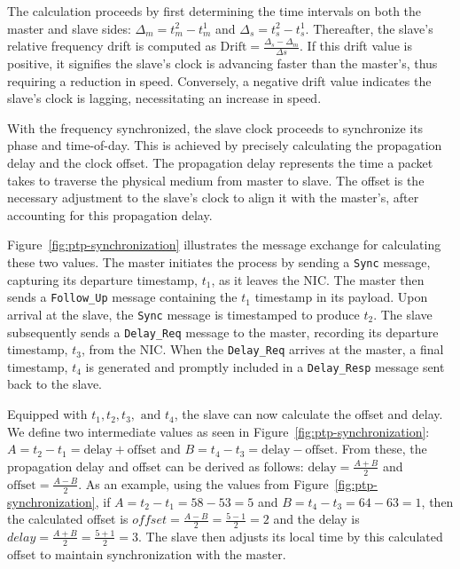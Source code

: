 The calculation proceeds by first determining the time intervals on both the master and slave sides: $\Delta_{m}=t_{m}^{2}-t_{m}^{1}$ and $\Delta_{s}=t_{s}^{2}-t_{s}^{1}$. Thereafter, the slave's relative frequency drift is computed as $\text{Drift}=\frac{\Delta_{s}-\Delta_{m}}{\Delta{s}}$. If this drift value is positive, it signifies the slave's clock is advancing faster than the master's, thus requiring a reduction in speed. Conversely, a negative drift value indicates the slave's clock is lagging, necessitating an increase in speed.

With the frequency synchronized, the slave clock proceeds to synchronize its phase and time-of-day. This is achieved by precisely calculating the propagation delay and the clock offset. The propagation delay represents the time a packet takes to traverse the physical medium from master to slave. The offset is the necessary adjustment to the slave's clock to align it with the master's, after accounting for this propagation delay.

Figure~\ref{fig:ptp-synchronization} illustrates the message exchange for calculating these two values. The master initiates the process by sending a \texttt{Sync} message, capturing its departure timestamp, $t_1$, as it leaves the \ac{NIC}. The master then sends a \texttt{Follow\_Up} message containing the $t_1$ timestamp in its payload. Upon arrival at the slave, the \texttt{Sync} message is timestamped to produce $t_2$. The slave subsequently sends a \texttt{Delay\_Req} message to the master, recording its departure timestamp, $t_3$, from the \ac{NIC}. When the \texttt{Delay\_Req} arrives at the master, a final timestamp, $t_4$ is generated and promptly included in a \texttt{Delay\_Resp} message sent back to the slave.

Equipped with $t_1, t_2, t_3, \text{ and } t_4$, the slave can now calculate the offset and delay. We define two intermediate values as seen in Figure~\ref{fig:ptp-synchronization}: $A=t_2-t_1=\text{delay}+\text{offset}$ and $B=t_4-t_3=\text{delay}-\text{offset}$. From these, the propagation delay and offset can be derived as follows: $\text{delay}=\frac{A+B}{2}$ and $\text{offset}=\frac{A-B}{2}$. As an example, using the values from Figure~\ref{fig:ptp-synchronization}, if $A=t_2-t_1=58-53=5$ and  $B=t_4-t_3=64-63=1$, then the calculated offset is ${offset}=\frac{A-B}{2}=\frac{5-1}{2}=2$ and the delay is ${delay}=\frac{A+B}{2}=\frac{5+1}{2}=3$. The slave then adjusts its local time by this calculated offset to maintain synchronization with the master.

